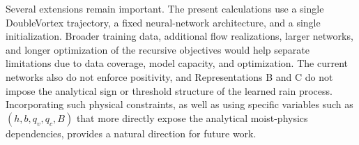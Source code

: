 \documentclass[12pt]{article}
\begin{document}
	Several extensions remain important. The present calculations use a single
	DoubleVortex trajectory, a fixed neural-network architecture, and a single
	initialization. Broader training data, additional flow realizations, larger
	networks, and longer optimization of the recursive objectives would help
	separate limitations due to data coverage, model capacity, and optimization.
	The current networks also do not enforce positivity, and Representations B and
	C do not impose the analytical sign or threshold structure of the learned rain
	process. Incorporating such physical constraints, as well as using specific
	variables such as $(h,b,q_v,q_c,B)$ that more directly expose the analytical
	moist-physics dependencies, provides a natural direction for future work.


	
	
\end{document}

